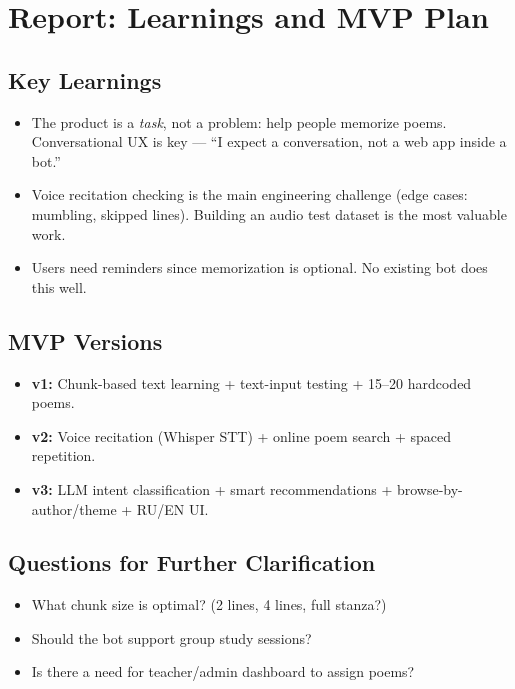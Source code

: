 \documentclass[11pt, a4paper]{article}
\begin{document}

\section{Report: Learnings and MVP Plan}

\subsection*{Key Learnings}
\begin{itemize}
    \item The product is a \textit{task}, not a problem: help people memorize poems. Conversational UX is key --- ``I expect a conversation, not a web app inside a bot.''
    \item Voice recitation checking is the main engineering challenge (edge cases: mumbling, skipped lines). Building an audio test dataset is the most valuable work.
    \item Users need reminders since memorization is optional. No existing bot does this well.
\end{itemize}

\subsection*{MVP Versions}
\begin{itemize}
    \item \textbf{v1:} Chunk-based text learning + text-input testing + 15--20 hardcoded poems.
    \item \textbf{v2:} Voice recitation (Whisper STT) + online poem search + spaced repetition.
    \item \textbf{v3:} LLM intent classification + smart recommendations + browse-by-author/theme + RU/EN UI.
\end{itemize}

\subsection*{Questions for Further Clarification}
\begin{itemize}
    \item What chunk size is optimal? (2 lines, 4 lines, full stanza?)
    \item Should the bot support group study sessions?
    \item Is there a need for teacher/admin dashboard to assign poems?
\end{itemize}
\end{document}
